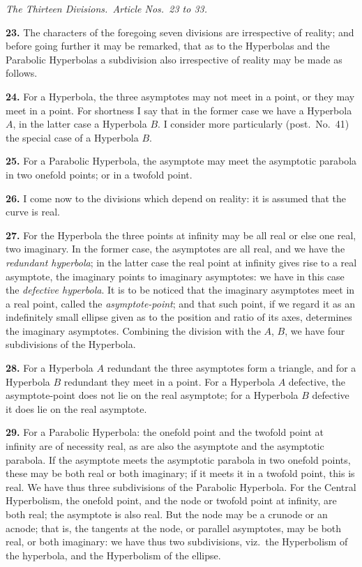 \documentclass[11pt,a4paper]{article}
\begin{document}
\medskip

\noindent\textit{The Thirteen Divisions.\ Article Nos.\ 23 to 33.}

\medskip

\textbf{23.} The characters of the foregoing seven divisions are irrespective of reality; and before going further it may be remarked, that as to the Hyperbolas and the Parabolic Hyperbolas a subdivision also irrespective of reality may be made as follows.

\medskip

\textbf{24.} For a Hyperbola, the three asymptotes may not meet in a point, or they may meet in a point. For shortness I say that in the former case we have a Hyperbola $A$, in the latter case a Hyperbola $B$. I consider more particularly (post.\ No.~41) the special case of a Hyperbola $B$.

\medskip

\textbf{25.} For a Parabolic Hyperbola, the asymptote may meet the asymptotic parabola in two onefold points; or in a twofold point.

\medskip

\textbf{26.} I come now to the divisions which depend on reality: it is assumed that the curve is real.

\medskip

\textbf{27.} For the Hyperbola the three points at infinity may be all real or else one real, two imaginary. In the former case, the asymptotes are all real, and we have the \emph{redundant hyperbola}; in the latter case the real point at infinity gives rise to a real asymptote, the imaginary points to imaginary asymptotes: we have in this case the \emph{defective hyperbola}. It is to be noticed that the imaginary asymptotes meet in a real point, called the \emph{asymptote-point}; and that such point, if we regard it as an indefinitely small ellipse given as to the position and ratio of its axes, determines the imaginary asymptotes. Combining the division with the $A$, $B$, we have four subdivisions of the Hyperbola.

\medskip

\textbf{28.} For a Hyperbola $A$ redundant the three asymptotes form a triangle, and for a Hyperbola $B$ redundant they meet in a point. For a Hyperbola $A$ defective, the asymptote-point does not lie on the real asymptote; for a Hyperbola $B$ defective it does lie on the real asymptote.

\medskip

\textbf{29.} For a Parabolic Hyperbola: the onefold point and the twofold point at infinity are of necessity real, as are also the asymptote and the asymptotic parabola. If the asymptote meets the asymptotic parabola in two onefold points, these may be both real or both imaginary; if it meets it in a twofold point, this is real. We have thus three subdivisions of the Parabolic Hyperbola. For the Central Hyperbolism, the onefold point, and the node or twofold point at infinity, are both real; the asymptote is also real. But the node may be a crunode or an acnode; that is, the tangents at the node, or parallel asymptotes, may be both real, or both imaginary: we have thus two subdivisions, viz.\ the Hyperbolism of the hyperbola, and the Hyperbolism of the ellipse.
\end{document}
